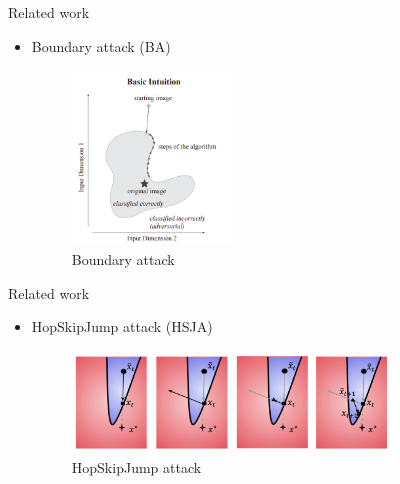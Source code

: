 \documentclass[11pt,t]{beamer}
\begin{document}
\begin{frame}{Related work}
\begin{itemize}
	\item Boundary attack (BA)
	\vspace{-32pt}
	\hspace{5pt}
	\begin{figure}
	\centering
	\hspace{5pt}
	\includegraphics[width=0.4\textwidth]{graphics/boundary_attack.png}
	\caption{Boundary attack \cite{brendel2018decisionbased}\label{fig:boundary_attack}}
	\footnotesize
	\flushleft
	\end{figure}
\end{itemize}

\end{frame}

%
\begin{frame}{Related work}
\begin{itemize}
	\item HopSkipJump attack (HSJA)
	\vspace{6pt}
	\begin{figure}
	\centering
	\includegraphics[width=0.8\textwidth]{graphics/hsj_attack.png}
	\caption{HopSkipJump attack \cite{chen2020hopskipjumpattack}\label{fig:hsj_attack}}
	\footnotesize
	\flushleft
	\end{figure}
\end{itemize}
\end{frame}
\end{document}
